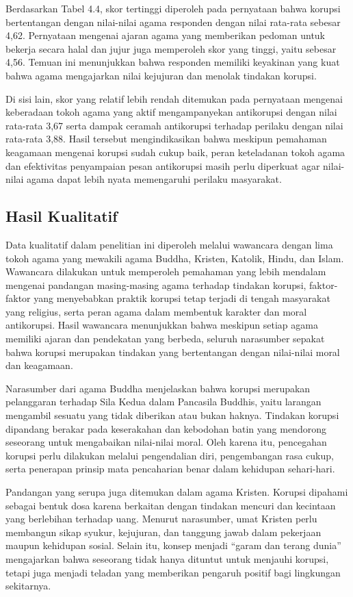 Berdasarkan Tabel 4.4, skor tertinggi diperoleh pada pernyataan bahwa korupsi bertentangan dengan nilai-nilai agama responden dengan nilai rata-rata sebesar 4,62. Pernyataan mengenai ajaran agama yang memberikan pedoman untuk bekerja secara halal dan jujur juga memperoleh skor yang tinggi, yaitu sebesar 4,56. Temuan ini menunjukkan bahwa responden memiliki keyakinan yang kuat bahwa agama mengajarkan nilai kejujuran dan menolak tindakan korupsi. 

Di sisi lain, skor yang relatif lebih rendah ditemukan pada pernyataan mengenai keberadaan tokoh agama yang aktif mengampanyekan antikorupsi dengan nilai rata-rata 3,67 serta dampak ceramah antikorupsi terhadap perilaku dengan nilai rata-rata 3,88. Hasil tersebut mengindikasikan bahwa meskipun pemahaman keagamaan mengenai korupsi sudah cukup baik, peran keteladanan tokoh agama dan efektivitas penyampaian pesan antikorupsi masih perlu diperkuat agar nilai-nilai agama dapat lebih nyata memengaruhi perilaku masyarakat. 

\subsection{Hasil Kualitatif}

Data kualitatif dalam penelitian ini diperoleh melalui wawancara dengan lima tokoh agama yang mewakili agama Buddha, Kristen, Katolik, Hindu, dan Islam. Wawancara dilakukan untuk memperoleh pemahaman yang lebih mendalam mengenai pandangan masing-masing agama terhadap tindakan korupsi, faktor-faktor yang menyebabkan praktik korupsi tetap terjadi di tengah masyarakat yang religius, serta peran agama dalam membentuk karakter dan moral antikorupsi. Hasil wawancara menunjukkan bahwa meskipun setiap agama memiliki ajaran dan pendekatan yang berbeda, seluruh narasumber sepakat bahwa korupsi merupakan tindakan yang bertentangan dengan nilai-nilai moral dan keagamaan. 

Narasumber dari agama Buddha menjelaskan bahwa korupsi merupakan pelanggaran terhadap Sila Kedua dalam Pancasila Buddhis, yaitu larangan mengambil sesuatu yang tidak diberikan atau bukan haknya. Tindakan korupsi dipandang berakar pada keserakahan dan kebodohan batin yang mendorong seseorang untuk mengabaikan nilai-nilai moral. Oleh karena itu, pencegahan korupsi perlu dilakukan melalui pengendalian diri, pengembangan rasa cukup, serta penerapan prinsip mata pencaharian benar dalam kehidupan sehari-hari. 

Pandangan yang serupa juga ditemukan dalam agama Kristen. Korupsi dipahami sebagai bentuk dosa karena berkaitan dengan tindakan mencuri dan kecintaan yang berlebihan terhadap uang. Menurut narasumber, umat Kristen perlu membangun sikap syukur, kejujuran, dan tanggung jawab dalam pekerjaan maupun kehidupan sosial. Selain itu, konsep menjadi “garam dan terang dunia” mengajarkan bahwa seseorang tidak hanya dituntut untuk menjauhi korupsi, tetapi juga menjadi teladan yang memberikan pengaruh positif bagi lingkungan sekitarnya. 

